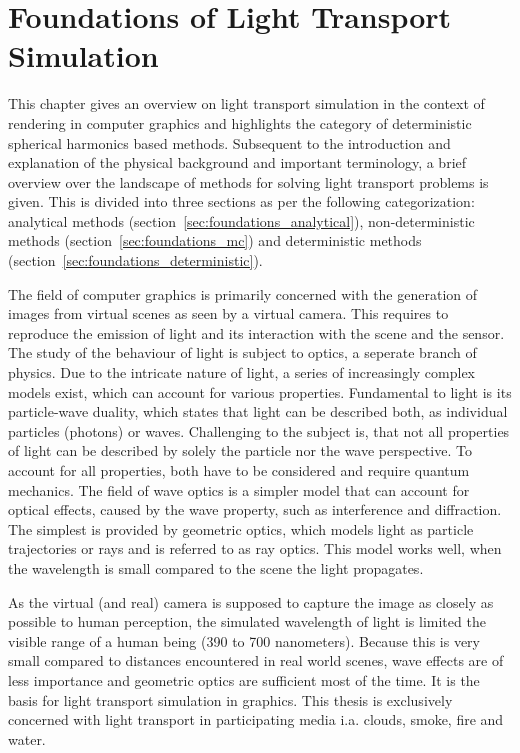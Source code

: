 \chapter{Foundations of Light Transport Simulation}
\label{sec:foundations}

This chapter gives an overview on light transport simulation in the context of rendering in computer graphics and highlights the category of deterministic spherical harmonics based methods. Subsequent to the introduction and explanation of the physical background and important terminology, a brief overview over the landscape of methods for solving light transport problems is given. This is divided into three sections as per the following categorization: analytical methods (section~\ref{sec:foundations_analytical}), non-deterministic methods (section~\ref{sec:foundations_mc}) and deterministic methods (section~\ref{sec:foundations_deterministic}).

The field of computer graphics is primarily concerned with the generation of images from virtual scenes as seen by a virtual camera. This requires to reproduce the emission of light and its interaction with the scene and the sensor. The study of the behaviour of light is subject to optics, a seperate branch of physics. Due to the intricate nature of light, a series of increasingly complex models exist, which can account for various properties. Fundamental to light is its particle-wave duality, which states that light can be described both, as individual particles (photons) or waves. Challenging to the subject is, that not all properties of light can be described by solely the particle nor the wave perspective. To account for all properties, both have to be considered and require quantum mechanics. The field of wave optics is a simpler model that can account for optical effects, caused by the wave property, such as interference and diffraction. The simplest is provided by geometric optics, which models light as particle trajectories or rays and is referred to as ray optics. This model works well, when the wavelength is small compared to the scene the light propagates. 

As the virtual (and real) camera is supposed to capture the image as closely as possible to human perception, the simulated wavelength of light is limited the visible range of a human being (390 to 700 nanometers). Because this is very small compared to distances encountered in real world scenes, wave effects are of less importance and geometric optics are sufficient most of the time. It is the basis for light transport simulation in graphics. This thesis is exclusively concerned with light transport in participating media i.a. clouds, smoke, fire and water.


